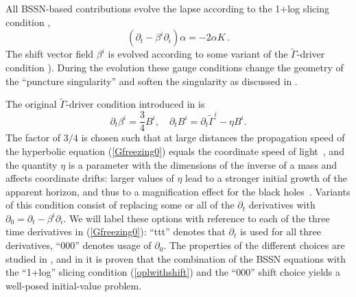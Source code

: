 All BSSN-based contributions evolve the lapse according to the 1+log
slicing condition \cite{Bona:1997hp}, \begin{equation}
(\partial_t - \beta^i \partial_i) \alpha = -2 \alpha
K\,. \label{oplwithshift} 
\end{equation}  
The shift vector field $\beta^i$ is evolved according to some variant of the
$\tilde\Gamma$-driver condition 
\cite{Alcubierre:2002kk,vanMeter:2006vi}). 
During the evolution these gauge conditions change the geometry of the
``puncture singularity'' and soften the singularity as discussed in
\cite{Hannam:2006vv,Hannam:2006xw,Brown:2007tb,Hannam:2008sg}. 

The original $\tilde\Gamma$-driver condition introduced in
\cite{Alcubierre:2002kk} is  
\begin{equation}
\label{Gfreezing0}
  \partial_t \beta^i = \frac{3}{4} B^i, \quad
  \partial_t B^i     = \partial_t \tilde \Gamma^i - \eta B^i.
\end{equation} 
The factor of $3/4$ is chosen such that at large distances the
propagation speed of the hyperbolic equation (\ref{Gfreezing0}) equals
the coordinate speed of light~\cite{Alcubierre:2002kk}, and the quantity
$\eta$ is a parameter with the dimensions of the inverse of a mass and
affects coordinate drifts: larger values of
$\eta$ lead to a stronger initial growth of the apparent horizon, and
thus to a magnification effect for the black
holes~\cite{Brugmann:2008zz}.
Variants of this condition
\cite{Campanelli:2005dd,Baker:2005vv,Baker:2006yw,vanMeter:2006vi,Gundlach:2006tw} 
consist of replacing some or all of the $\partial_t$ derivatives with
$\partial_0 = \partial_t - \beta^i \partial_i$. We will label these options
with reference to each of the three time derivatives in
(\ref{Gfreezing0}): ``ttt'' denotes that $\partial_t$ is used for all three
derivatives, ``000'' denotes usage of $\partial_0$. The properties of
the different choices are studied in
\cite{Gundlach:2006tw,vanMeter:2006vi}, and in
\cite{Gundlach:2006tw} it is proven that the combination of the BSSN
equations with the ``1+log'' slicing condition (\ref{oplwithshift})
and the ``000'' shift choice yields a well-posed initial-value problem. 

